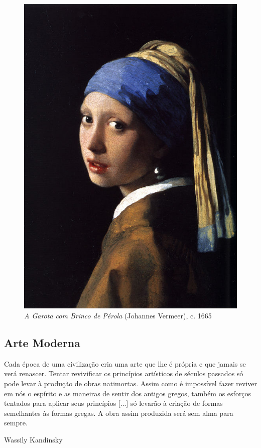 \begin{figure}[ht!]
  \begin{center}
    \includegraphics[scale=1.3]{figs/vermeer_perola.png}
  \caption{\emph{A Garota com Brinco de Pérola} (Johannes Vermeer), c. 1665}
  \label{fig:vermeer:perola}
  \end{center}
\end{figure}

\subsection{Arte Moderna}

\setlength{\epigraphwidth}{0.8\textwidth}
\epigraph{Cada época de uma civilização cria uma arte que lhe é própria e que
  jamais se verá renascer. Tentar revivificar os princípios artísticos de
  séculos passados só pode levar à produção de obras natimortas. Assim como é
  impossível fazer reviver em nós o espírito e as maneiras de sentir dos antigos
  gregos, também os esforços tentados para aplicar seus princípios [...] só
  levarão à criação de formas semelhantes às formas gregas. A obra assim
  produzida será sem alma para sempre.}{Wassily Kandinsky~\cite{kandinsky}}

